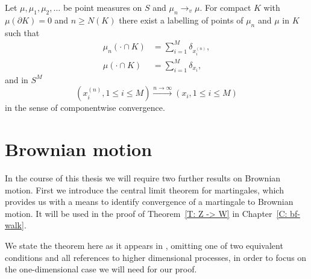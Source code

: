 \begin{lemma} \label{L: pointwise convergence}
	Let $\mu, \mu_1, \mu_2, \dots$ be point measures on $S$ and $\mu_n \rightarrow_v \mu$.
	For compact $K$ with $\mu(\partial K) = 0$ and $n \geq N(K)$
	there exist a labelling of points of $\mu_n$ and $\mu$ in $K$ such that
	\begin{equation}
	\begin{aligned}
		\mu_n(\cdot \cap K) &= \sum_{i=1}^{M} \delta_{x_i^{(n)}}, \\
		\mu(\cdot \cap K) &= \sum_{i=1}^{M} \delta_{x_i},
	\end{aligned}
	\end{equation}
	and in $S^M$
	\begin{equation}
		( x_i^{(n)}, 1 \leq i \leq M ) \xrightarrow{n \rightarrow \infty}
		( x_i, 1 \leq i \leq M  ) 
	\end{equation}
	in the sense of componentwise convergence.
\end{lemma}




\section{Brownian motion}

In the course of this thesis we will require two further results on Brownian motion.
First we introduce the central limit theorem for martingales,
which provides us with a means to identify convergence of a martingale to Brownian motion.
It will be used in the proof of Theorem~\ref{T: Z -> W} in Chapter~\ref{C: bf-walk}.

We state the theorem here as it appears in \cite[Theorem 1.4, p.339 f.]{Ethier.2005},
omitting one of two equivalent conditions and all references to higher dimensional processes,
in order to focus on the one-dimensional case we will need for our proof.

